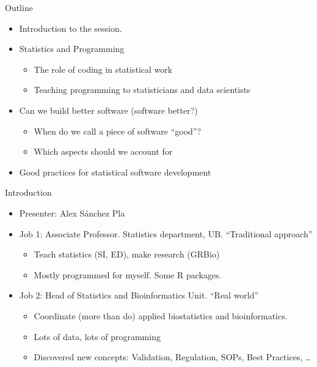 \documentclass[ignorenonframetext,]{beamer}
\providecommand{\tightlist}{%
  \setlength{\itemsep}{0pt}\setlength{\parskip}{0pt}}
\begin{document}
\begin{frame}{%
\protect\hypertarget{outline}{%
Outline}}

\begin{itemize}
\tightlist
\item
  Introduction to the session.
\item
  Statistics and Programming

  \begin{itemize}
  \tightlist
  \item
    The role of coding in statistical work
  \item
    Teaching programming to statisticians and data scientists
  \end{itemize}
\item
  Can we build better software (software better?)

  \begin{itemize}
  \tightlist
  \item
    When do we call a piece of software “good”?
  \item
    Which aspects should we account for
  \end{itemize}
\item
  Good practices for statistical software development
\end{itemize}

\end{frame}

\begin{frame}{%
\protect\hypertarget{introduction}{%
Introduction}}

\begin{itemize}
\tightlist
\item
  Presenter: Alex Sánchez Pla
\item
  Job 1: Associate Professor. Statistics department, UB. “Traditional
  approach”

  \begin{itemize}
  \tightlist
  \item
    Teach statistics (SI, ED), make research (GRBio)
  \item
    Mostly programmed for myself. Some R packages.
  \end{itemize}
\item
  Job 2: Head of Statistics and Bioinformatics Unit. “Real world”

  \begin{itemize}
  \tightlist
  \item
    Coordinate (more than do) applied biostatistics and bioinformatics.
  \item
    Lots of data, lots of programming
  \item
    Discovered new concepts: Validation, Regulation, SOPs, Best
    Practices, \ldots{}
  \end{itemize}
\end{itemize}

\end{frame}
\end{document}
